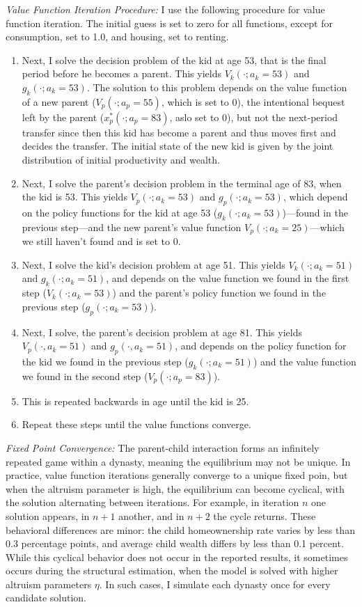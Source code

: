 \documentclass[12pt]{article}
\begin{document}
\textit{Value Function Iteration Procedure:}
I use the following procedure for value function iteration. The initial guess is set to zero for all functions, except for consumption, set to 1.0, and housing, set to renting.
\begin{enumerate}
    \item Next, I solve the decision problem of the kid at age 53, that is the final period before he becomes a parent. This yields $V_k(\cdot;a_k=53)$ and $g_k(\cdot;a_k=53)$. The solution to this problem depends on the value function of a new parent ($V_p(\cdot;a_p=55)$, which is set to 0), the intentional bequest left by the parent ($x_p^*(\cdot;a_p=83)$, aslo set to 0), but not the next-period transfer since then this kid has become a parent and thus moves first and decides the transfer. The initial state of the new kid is given by the joint distribution of initial productivity and wealth.
    \item Next, I solve the parent's decision problem in the terminal age of 83, when the kid is 53. This yields $V_p(\cdot;a_k=53)$ and $g_p(\cdot;a_k=53)$, which depend on the policy functions for the kid at age 53 ($g_k(\cdot;a_k=53)$)---found in the previous step---and the new parent's value function $V_p(\cdot;a_k=25)$---which we still haven't found and is set to 0.
    \item Next, I solve the kid's decision problem at age 51. This yields $V_k(\cdot;a_k=51)$ and $g_k(\cdot;a_k=51)$, and depends on the value function we found in the first step ($V_k(\cdot;a_k=53)$) and the parent's policy function we found in the previous step ($g_p(\cdot;a_k=53)$).
    \item Next, I solve, the parent's decision problem at age 81. This yields $V_p(\cdot,a_k=51)$ and $g_p(\cdot,a_k=51)$, and depends on the policy function for the kid we found in the previous step ($g_k(\cdot;a_k=51)$) and the value function we found in the second step ($V_p(\cdot;a_p=83)$).
    \item This is repeated backwards in age until the kid is 25.
    \item Repeat these steps until the value functions converge.
\end{enumerate}

\textit{Fixed Point Convergence:} 
The parent-child interaction forms an infinitely repeated game within a dynasty, meaning the equilibrium may not be unique. In practice, value function iterations generally converge to a unique fixed poin, but when the altruism parameter is high, the equilibrium can become cyclical, with the solution alternating between iterations. For example, in iteration $n$ one solution appears, in $n+1$ another, and in $n+2$ the cycle returns. These behavioral differences are minor: the child homeownership rate varies by less than 0.3 percentage points, and average child wealth differs by less than 0.1 percent. While this cyclical behavior does not occur in the reported results, it sometimes occurs during the structural estimation, when the model is solved with higher altruism parameters $\eta$. In such cases, I simulate each dynasty once for every candidate solution.
\end{document}
